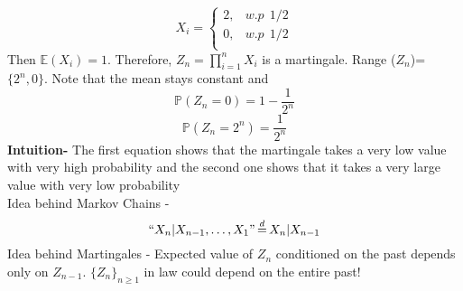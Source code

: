 \documentclass[main]{subfiles}
\begin{document}
\ex
\begin{equation*}
    X_i=
    \begin{cases}
        2 , & w.p ~~ 1/2 \\
        0 , & w.p ~~1/2  \\
    \end{cases}
\end{equation*}
Then $\mathbb{E} (X_i)=1$. Therefore, $Z_n= \prod_{i=1}^n X_i$ is a martingale. Range ($Z_n$)= $\{2^n,0\}$. Note that the mean stays constant and
$$\mathbb{P}(Z_n=0)=1-\frac{1}{2^n}$$
$$\mathbb{P}(Z_n=2^n)=\frac{1}{2^n}$$
\textbf{Intuition-} The first equation shows that the martingale takes a very low value with very high probability and the second one shows that it takes a very large value with very low probability\\
Idea behind Markov Chains -
$$``X_n | X_{n-1}, \ldots, X_1" \,{\buildrel d \over =}\, X_n|X_{n-1}$$
Idea behind Martingales -
Expected value of $Z_n$ conditioned on the past depends only on $Z_{n-1}$. $\{Z_n\}_{n \geq 1}$ in law could depend on the entire past!

\end{document}

